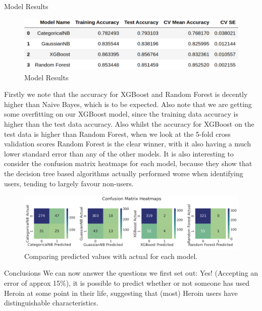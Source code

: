 \documentclass[6pt, final, xcolor=table]{beamer}
\newlength{\colwidth}
\begin{document}
\begin{frame}[t]
\begin{columns}[t]
\begin{column}{\colwidth}
\begin{block}{Model Results}
  \begin{figure}[h!]
    \centering
     \includegraphics[scale=1.5]{model_results.png}
    \caption{Model Results}
    \label{fig:method}
    \end{figure}  
    
Firstly we note that the accuracy for XGBoost and Random Forest is decently higher than
Naive Bayes, which is to be expected. Also note that we are getting some overfitting on our
XGBoost model, since the training data accuracy is higher than the test data accuracy.
Also whilst the accuracy for XGBoost on the test data is higher than Random Forest,
when we look at the 5-fold cross validation scores Random Forest is the clear winner,
with it also having a much lower standard error than any of the other models.
It is also interesting to consider the confusion matrix heatmaps for each model, because they show that the decision tree based algorithms actually performed worse when identifying users, tending to largely favour non-users.
 
  \begin{figure}[h!]
    \centering
     \includegraphics[scale=0.9]{conf_mat_heatmaps.png}
    \caption{Comparing predicted values with actual for each model.}
    \label{fig:conf_matrix}
    \end{figure}   

  \end{block}
  \begin{alertblock}{Conclusions}
We can now answer the questions we first set out:
Yes! (Accepting an error of approx 15\%), it is possible to predict whether or not
someone has used Heroin at some point in their life, suggesting
that (most) Heroin users have distinguishable characteristics.
  \end{alertblock}
  

\end{column}
\end{columns}
\end{frame}
\end{document}
